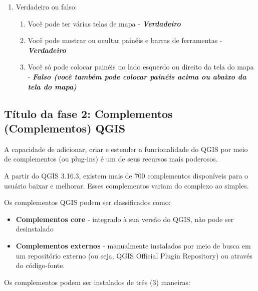 \documentclass[
]{book}
\providecommand{\tightlist}{%
  \setlength{\itemsep}{0pt}\setlength{\parskip}{0pt}}
\begin{document}
\begin{enumerate}
\def\labelenumi{\arabic{enumi}.}
\tightlist
\item
  Verdadeiro ou falso:

  \begin{enumerate}
  \def\labelenumii{\arabic{enumii}.}
  \tightlist
  \item
    Você pode ter várias telas de mapa - \textbf{\emph{Verdadeiro}}
  \item
    Você pode mostrar ou ocultar painéis e barras de ferramentas - \textbf{\emph{Verdadeiro}}
  \item
    Você só pode colocar painéis no lado esquerdo ou direito da tela do mapa - \textbf{\emph{Falso (você também pode colocar painéis acima ou abaixo da tela do mapa)}}
  \end{enumerate}
\end{enumerate}

\hypertarget{tuxedtulo-da-fase-2-complementos-complementos-qgis}{%
\subsection{Título da fase 2: Complementos (Complementos) QGIS}\label{tuxedtulo-da-fase-2-complementos-complementos-qgis}}

A capacidade de adicionar, criar e estender a funcionalidade do QGIS por meio de complementos (ou plug-ins) é um de seus recursos mais poderosos.

A partir do QGIS 3.16.3, existem mais de 700 complementos disponíveis para o usuário baixar e melhorar. Esses complementos variam do complexo ao simples.

Os complementos QGIS podem ser classificados como:

\begin{itemize}
\tightlist
\item
  \textbf{Complementos core} - integrado à sua versão do QGIS, não pode ser desinstalado
\item
  \textbf{Complementos externos} - manualmente instalados por meio de busca em um repositório externo (ou seja, QGIS Official Plugin Repository) ou através do código-fonte.
\end{itemize}

Os complementos podem ser instalados de três (3) maneiras:
\end{document}
